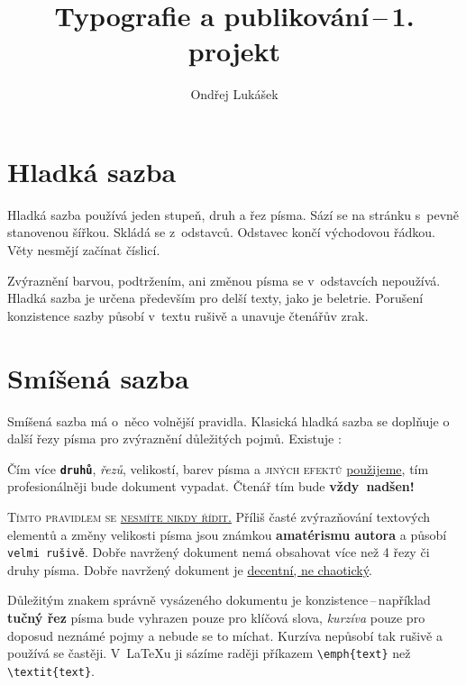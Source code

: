 \documentclass[a4paper, 10pt, twocolumn]{article}
\title{Typografie a publikování\,--\,1. projekt}
\author{Ondřej Lukášek \vfill \email{xlukas15@stud.fit.vutbr.cz}}
\date{}
\begin{document}
\maketitle
\section{Hladká sazba}\label{1hladka}

Hladká sazba používá jeden stupeň, druh a řez písma.
Sází se na stránku s~pevně stanovenou šířkou.
Skládá se z~odstavců. Odstavec končí východovou řádkou.
Věty nesmějí začínat číslicí.

Zvýraznění barvou, podtržením, ani změnou písma se v~odstavcích nepoužívá.
Hladká sazba je určena především pro delší texty, jako je beletrie.
Porušení konzistence sazby působí v~textu rušivě a unavuje čtenářův zrak.


\section{Smíšená sazba}\label{2smisena}

Smíšená sazba má o~něco volnější pravidla. Klasická hladká sazba se doplňuje o další řezy písma pro zvýraznění dů\-le\-ži\-tých pojmů.
Existuje :

\begin{adjustwidth}{0.6cm}{0.4cm}
\medskip
\hspace{3mm}
Čím více \texttt{\textbf{druhů}}, \textit{řezů}, {\tiny velikostí}, {\color{green}barev} písma a {\color{blue}\textsc{jiných efektů}} \underline{použijeme}, {\color{red}tím pro\-fe\-si\-o\-nál\-ně\-ji} bude {\selectfont dokument} vypadat.
Čtenář tím bude {\Huge\textbf{vždy~nadšen!}}
\end{adjustwidth}

\bigskip
\textsc{Tímto pravidlem se \underline{nesmíte nikdy řídit.}}
Příliš časté zvýrazňování textových elementů a změny {\scriptsize velikosti} písma jsou známkou \textbf{amatérismu autora} a působí \texttt{velmi rušivě}.
Dobře navržený dokument nemá obsahovat více než 4 řezy či druhy písma.
Dobře navržený dokument je \underline{decentní, ne chaotický}.

Důležitým znakem správně vysázeného dokumentu je konzistence\,--\,například \textbf{tučný řez} písma bude vyhrazen pouze pro klíčová slova, \textit{kurzíva} pouze pro doposud ne\-zná\-mé pojmy a nebude se to míchat.
Kurzíva nepůsobí tak rušivě a používá se častěji.
V~\LaTeX u ji sázíme raději příkazem \texttt{\textbackslash emph\{text\}} než \texttt{\textbackslash textit\{text\}}.
\end{document}
